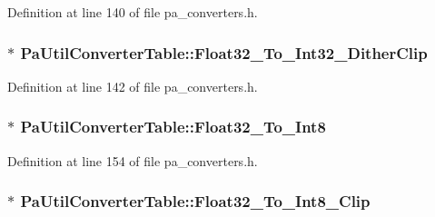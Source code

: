 Definition at line 140 of file pa\+\_\+converters.\+h.

\subsubsection[{\texorpdfstring{Float32\+\_\+\+To\+\_\+\+Int32\+\_\+\+Dither\+Clip}{Float32_To_Int32_DitherClip}}]{$\ast$ Pa\+Util\+Converter\+Table\+::\+Float32\+\_\+\+To\+\_\+\+Int32\+\_\+\+Dither\+Clip}\hypertarget{struct_pa_util_converter_table_a2e77a1a47e4018a4494197f95a7292b2}{}\label{struct_pa_util_converter_table_a2e77a1a47e4018a4494197f95a7292b2}


Definition at line 142 of file pa\+\_\+converters.\+h.

\subsubsection[{\texorpdfstring{Float32\+\_\+\+To\+\_\+\+Int8}{Float32_To_Int8}}]{$\ast$ Pa\+Util\+Converter\+Table\+::\+Float32\+\_\+\+To\+\_\+\+Int8}\hypertarget{struct_pa_util_converter_table_a0daeb8fb3c880f6c08b3182e5b1604a4}{}\label{struct_pa_util_converter_table_a0daeb8fb3c880f6c08b3182e5b1604a4}


Definition at line 154 of file pa\+\_\+converters.\+h.

\subsubsection[{\texorpdfstring{Float32\+\_\+\+To\+\_\+\+Int8\+\_\+\+Clip}{Float32_To_Int8_Clip}}]{$\ast$ Pa\+Util\+Converter\+Table\+::\+Float32\+\_\+\+To\+\_\+\+Int8\+\_\+\+Clip}\hypertarget{struct_pa_util_converter_table_a2d1a63569dd768d4d482ce29c86b8792}{}\label{struct_pa_util_converter_table_a2d1a63569dd768d4d482ce29c86b8792}


